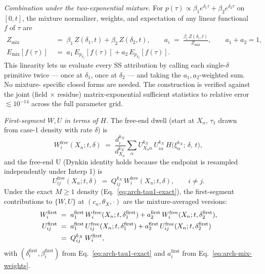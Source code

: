 \emph{Combination under the two-exponential mixture.}
For $p(\tau) \propto \beta_1 e^{\delta_1 \tau} + \beta_2 e^{\delta_2 \tau}$
on $[0, t]$, the mixture normalizer, weights, and expectation of any
linear functional $f$ of $\tau$ are
\begin{align}
  Z_{\mathrm{mix}}
  &\;=\; \beta_1\, Z(\delta_1, t) + \beta_2\, Z(\delta_2, t),
  \qquad
  a_i \;=\; \frac{\beta_i\, Z(\delta_i, t)}{Z_{\mathrm{mix}}},
  \qquad a_1 + a_2 = 1,
  \label{eq:arch-mix-weights} \\[4pt]
  E_{\mathrm{mix}}[f(\tau)]
  &\;=\; a_1\, E_{p_{\delta_1}}[f(\tau)] + a_2\, E_{p_{\delta_2}}[f(\tau)].
  \label{eq:arch-mix-linearity}
\end{align}
This linearity lets us evaluate every SS attribution by calling each
single-$\delta$ primitive twice --- once at $\delta_1$, once at
$\delta_2$ --- and taking the $a_1, a_2$-weighted sum. No mixture-
specific closed forms are needed. The construction is verified against
the joint (field $\times$ residue) matrix-exponential sufficient
statistics to relative error $\lesssim 10^{-14}$ across the full
parameter grid.

\emph{First-segment $W, U$ in terms of $H$.}
The free-end dwell (start at $X_n$, $\tau_1$ drawn from case-1 density with
rate $\delta$) is
\begin{equation}
  W_i^{\mathrm{free}}(X_n; t, \delta)
  \;=\; \frac{d^{k_X}_i}{d^{k_X}_{X_n}}
    \sum_\alpha U^{k_X}_{X_n \alpha}\, U^{k_X}_{i\alpha}\,
      H\!\bigl(\xi^{k_X}_\alpha;\, \delta,\, t\bigr),
  \label{eq:arch-Wfree}
\end{equation}
and the free-end U (Dynkin identity holds because the endpoint is
resampled independently under Interp 1) is
\begin{equation}
  U^{\mathrm{free}}_{ij}(X_n; t, \delta) \;=\;
    Q^{k_X}_{ij}\, W_i^{\mathrm{free}}(X_n; t, \delta),
  \qquad i \ne j.
  \label{eq:arch-Ufree}
\end{equation}
Under the exact $M \geq 1$ density (Eq.~\ref{eq:arch-tau1-exact}), the
first-segment contributions to $\{W, U\}$ at $(c_n, \theta_X, \cdot)$
are the mixture-averaged versions:
\begin{align}
  W^{\text{first}}_i
  &\;=\; a_1^{\text{first}}\, W_i^{\mathrm{free}}(X_n; t, \delta_1^{\text{first}})
    + a_2^{\text{first}}\, W_i^{\mathrm{free}}(X_n; t, \delta_2^{\text{first}}),
  \label{eq:arch-Wfirst-mix} \\
  U^{\text{first}}_{ij}
  &\;=\; a_1^{\text{first}}\, U^{\mathrm{free}}_{ij}(X_n; t, \delta_1^{\text{first}})
    + a_2^{\text{first}}\, U^{\mathrm{free}}_{ij}(X_n; t, \delta_2^{\text{first}})
  \notag \\
  &\;=\; Q^{k_X}_{ij}\, W^{\text{first}}_i,
  \label{eq:arch-Ufirst-mix}
\end{align}
with $(\delta_i^{\text{first}}, \beta_i^{\text{first}})$ from
Eq.~\ref{eq:arch-tau1-exact} and $a_i^{\text{first}}$ from
Eq.~\ref{eq:arch-mix-weights}.

